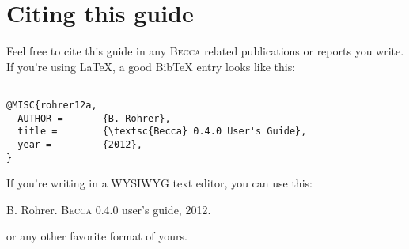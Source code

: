 \chapter{Citing this guide}

Feel free to cite this guide in any \textsc{Becca} related publications or reports you write. If you're using \LaTeX, a good BibTeX entry looks like this:

\begin{verbatim}

@MISC{rohrer12a,
  AUTHOR =       {B. Rohrer},
  title =        {\textsc{Becca} 0.4.0 User's Guide},
  year =         {2012},
}

\end{verbatim}

If you're writing in a WYSIWYG text editor, you can use this:

B. Rohrer. \textsc{Becca} 0.4.0 user's guide, 2012.

or any other favorite format of yours. 
